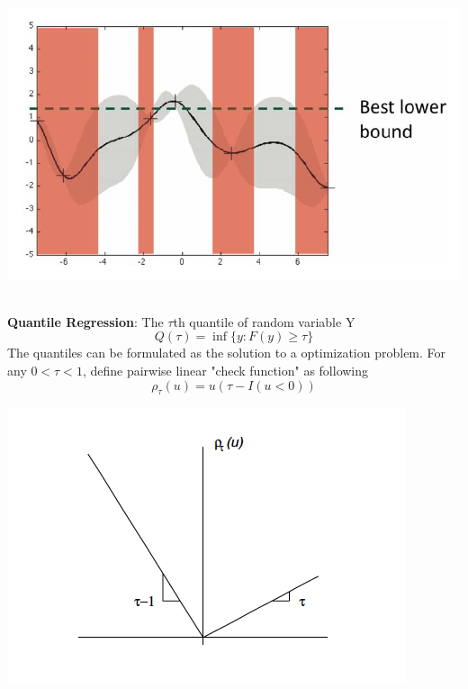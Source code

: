 \documentclass[a0,portrait]{a0poster}
\begin{document}
\begin{multicols}{2}
\begin{center}
	\includegraphics[width=\columnwidth]{fig/GPUCB.png}
	\label{fig:3settings}
\end{center}\\
\textbf{Quantile Regression}: The $\tau$th quantile of random variable Y
$$Q(\tau) = \inf\{y: F(y) \geq \tau\}$$
The quantiles can be formulated as the solution to a optimization problem. For any $0 < \tau < 1$, define pairwise linear "check function" as following \cite{koenker2001quantile}
$$\rho_\tau(u) = u(\tau - I(u<0))$$
\begin{center}
	\includegraphics[width=\columnwidth]{fig/quant.png}
	\label{fig:quant}
\end{center}\\

\end{multicols}
\end{document}
